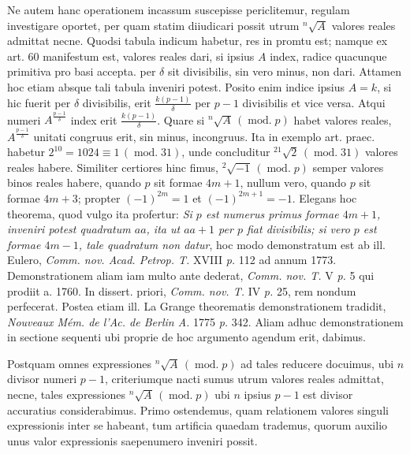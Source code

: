 Ne autem hanc operationem incassum suscepisse periclitemur, regulam investigare oportet, per quam statim diiudicari possit utrum ${}^{n}\!\surd {A}$ valores reales admittat necne. Quodsi tabula indicum habetur, res in promtu est; namque ex art. 60 manifestum est, valores reales dari, si ipsius $A$ index, radice quacunque primitiva pro basi accepta. per $\delta$ sit divisibilis, sin vero minus, non dari. Attamen hoc etiam absque tali tabula inveniri potest. Posito enim indice ipsius $A=k$, si hic fuerit per $\delta$ divisibilis, erit $\frac{k(p-1)}{\delta}$ per $p-1$ divisibilis et vice versa. Atqui numeri $A^{\frac{p-1}{\delta}}$ index erit $\frac{k(p-1)}{\delta}$. Quare si ${}^{n}\!\surd {A}\,(\operatorname{mod.}p)$ habet valores reales, $A^{\frac{p-1}{\delta}}$ unitati congruus erit, sin minus, incongruus. Ita in exemplo art. praec. habetur $2^{10}=1024\equiv1\,(\operatorname{mod.}31)$, unde concluditur ${}^{21}\!\surd {2}\,(\operatorname{mod.}31)$ valores reales habere.
Similiter certiores hinc fimus, ${}^{2}\!\surd {-1}\,(\operatorname{mod.}p)$ semper valores binos reales habere, quando $p$ sit formae $4m+1$, nullum vero, quando $p$ sit formae $4m+3$; propter $(-1)^{2m}=1$ et $(-1)^{2m+1}=-1$. Elegans hoc theorema, quod vulgo ita profertur: \emph{Si $p$ est numerus primus formae $4m+1$, inveniri potest quadratum $aa$, ita ut $aa+1$ per $p$ fiat divisibilis; si vero $p$ est formae $4m-1$, tale quadratum non datur}, hoc modo demonstratum est ab ill. Eulero, \emph{Comm. nov. Acad. Petrop. T.} XVIII \emph{p.} 112 ad annum 1773. Demonstrationem aliam iam multo ante dederat, \emph{Comm. nov. T.} V \emph{p.} 5 qui prodiit a. 1760. In dissert. priori, \emph{Comm. nov. T.} IV \emph{p.} 25, rem nondum
perfecerat. Postea etiam ill. La Grange theorematis demonstrationem tradidit, \emph{Nouveaux Mém. de l'Ac. de Berlin A.} 1775 \emph{p.} 342. Aliam adhuc demonstrationem in sectione sequenti ubi proprie de hoc argumento agendum erit, dabimus.


Postquam omnes expressiones ${}^{n}\!\surd {A}\,(\operatorname{mod.}p)$ ad tales reducere docuimus, ubi $n$ divisor numeri $p-1$, criteriumque nacti sumus utrum valores reales admittat, necne, tales expressiones ${}^{n}\!\surd {A}\,(\operatorname{mod.}p)$ ubi $n$ ipsius $p-1$ est divisor accuratius considerabimus. Primo ostendemus, quam relationem valores singuli expressionis inter se habeant, tum artificia quaedam trademus, quorum auxilio unus valor expressionis saepenumero inveniri possit.


